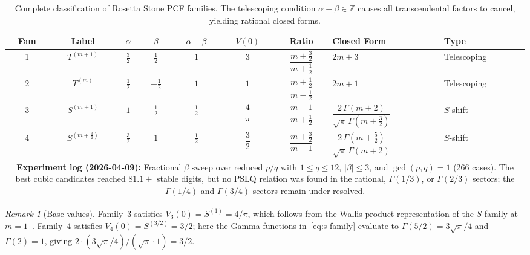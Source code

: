 \documentclass[11pt,a4paper]{article}
\theoremstyle{definition}
\theoremstyle{remark}
\newtheorem{remark}[theorem]{Remark}
\begin{document}
\begin{table}[ht]
\centering
\caption{Complete classification of Rosetta Stone PCF families.
The telescoping condition $\alpha - \beta \in \mathbb{Z}$ causes all
transcendental factors to cancel, yielding rational closed forms.}
\label{tab:rosetta}
\begin{tabular}{cccccccll}
\toprule
Fam & Label & $\alpha$ & $\beta$ & $\alpha{-}\beta$
    & $V(0)$ & Ratio & Closed Form & Type \\
\midrule
1 & $T^{(m+1)}$   & $\frac{3}{2}$ & $\frac{1}{2}$  & $1$
  & $3$            & $\dfrac{m+\frac{3}{2}}{m+\frac{1}{2}}$
  & $2m + 3$       & Telescoping \\[6pt]
2 & $T^{(m)}$     & $\frac{1}{2}$ & $-\frac{1}{2}$ & $1$
  & $1$            & $\dfrac{m+\frac{1}{2}}{m-\frac{1}{2}}$
  & $2m + 1$       & Telescoping \\[6pt]
3 & $S^{(m+1)}$   & $1$   & $\frac{1}{2}$  & $\frac{1}{2}$
  & $\dfrac{4}{\pi}$ & $\dfrac{m+1}{m+\frac{1}{2}}$
  & $\dfrac{2\,\Gamma(m+2)}{\sqrt{\pi}\,\Gamma(m+\frac{3}{2})}$
  & $S$-shift \\[6pt]
4 & $S^{(m+\frac{3}{2})}$ & $\frac{3}{2}$ & $1$    & $\frac{1}{2}$
  & $\dfrac{3}{2}$   & $\dfrac{m+\frac{3}{2}}{m+1}$
  & $\dfrac{2\,\Gamma(m+\frac{5}{2})}{\sqrt{\pi}\,\Gamma(m+2)}$
  & $S$-shift \\
\midrule
\multicolumn{9}{p{0.92\linewidth}}{\textbf{Experiment log (2026-04-09):} Fractional $\beta$ sweep over reduced $p/q$ with $1 \le q \le 12$, $|\beta| \le 3$, and $\gcd(p,q)=1$ (266 cases). The best cubic candidates reached $81.1{+}$ stable digits, but no PSLQ relation was found in the rational, $\Gamma(1/3)$, or $\Gamma(2/3)$ sectors; the $\Gamma(1/4)$ and $\Gamma(3/4)$ sectors remain under-resolved.} \\
\bottomrule
\end{tabular}
\end{table}

\begin{remark}[Base values]
Family~3 satisfies $V_3(0) = S^{(1)} = 4/\pi$, which follows from
the Wallis-product representation of the $S$-family
at $m=1$~\cite{lange1999elementary}.
Family~4 satisfies $V_4(0) = S^{(3/2)} = 3/2$; here the Gamma
functions in~\eqref{eq:s-family} evaluate to $\Gamma(5/2) = 3\sqrt\pi/4$
and $\Gamma(2) = 1$, giving $2 \cdot (3\sqrt\pi/4)/(\sqrt\pi \cdot 1) = 3/2$.
\end{remark}

\end{document}
